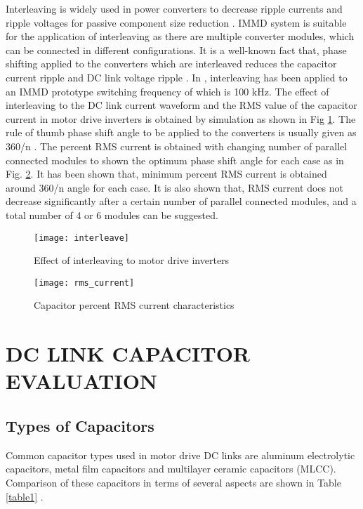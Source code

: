 \documentclass[conference,a4paper,twocolumn]{IEEEtran}
\begin{document}
Interleaving is widely used in power converters to decrease ripple currents and ripple voltages for passive component size reduction \cite{Zhang2010}. IMMD system is suitable for the application of interleaving as there are multiple converter modules, which can be connected in different configurations. It is a well-known fact that, phase shifting applied to the converters which are interleaved reduces the capacitor current ripple and DC link voltage ripple \cite{LoCalzo2016,Wang2015,Su2010}. In \cite{Wang2015}, interleaving has been applied to an IMMD prototype switching frequency of which is 100 kHz. The effect of interleaving to the DC link current waveform and the RMS value of the capacitor current in motor drive inverters is obtained by simulation as shown in Fig \ref{fig4}.
The rule of thumb phase shift angle to be applied to the converters is usually given as 360/n \cite{LoCalzo2016}. The percent RMS current is obtained with changing number of parallel connected modules to shown the optimum phase shift angle for each case as in Fig. \ref{fig5}. It has been shown that, minimum percent RMS current is obtained around 360/n angle for each case. It is also shown that, RMS current does not decrease significantly after a certain number of parallel connected modules, and a total number of 4 or 6 modules can be suggested.


\begin{figure}[h]
  \centering
  \texttt{[image: interleave]}
  \caption{Effect of interleaving to motor drive inverters}
  \label{fig4}
\end{figure}


\begin{figure}[h]
  \centering
  \texttt{[image: rms\_current]}
  \caption{Capacitor percent RMS current characteristics}
  \label{fig5}
\end{figure}





\section{DC LINK CAPACITOR EVALUATION}

\subsection{Types of Capacitors}



Common capacitor types used in motor drive DC links are aluminum electrolytic capacitors, metal film capacitors and multilayer ceramic capacitors (MLCC). Comparison of these capacitors in terms of several aspects are shown in Table \ref{table1} \cite{LoCalzo2016,Lambert2015a,Wang2013,Wang2015,Brown2007}.
\end{document}
